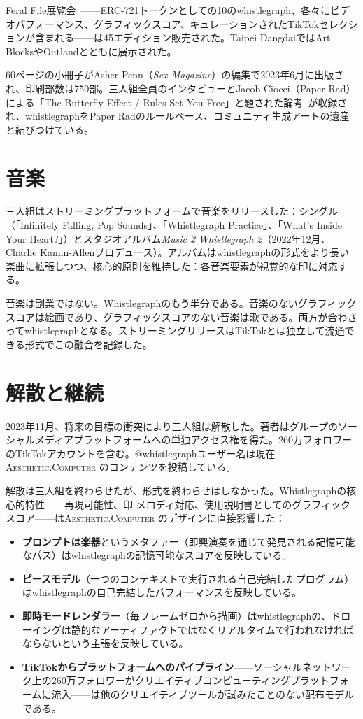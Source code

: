 \documentclass[10pt,letterpaper,twocolumn]{article}
\newcommand{\ac}{\textsc{Aesthetic.Computer}}
\begin{document}
Feral File展覧会~\citep{feralfile2022ten}——ERC-721トークンとしての10のwhistlegraph、各々にビデオパフォーマンス、グラフィックスコア、キュレーションされたTikTokセレクションが含まれる——は45エディション販売された。Taipei DangdaiではArt BlocksやOutlandとともに展示された。

60ページの小冊子がAsher Penn（\emph{Sex Magazine}）の編集で2023年6月に出版され、印刷部数は750部。三人組全員のインタビューとJacob Ciocci（Paper Rad）による「The Butterfly Effect / Rules Set You Free」と題された論考~\citep{ciocci2023butterfly}が収録され、whistlegraphをPaper Radのルールベース、コミュニティ生成アートの遺産と結びつけている。

\section{音楽}

三人組はストリーミングプラットフォームで音楽をリリースした：シングル（「Infinitely Falling, Pop Sounds」、「Whistlegraph Practice」、「What's Inside Your Heart?」）とスタジオアルバム\emph{Music 2 Whistlegraph 2}（2022年12月、Charlie Kamin-Allenプロデュース）。アルバムはwhistlegraphの形式をより長い楽曲に拡張しつつ、核心的原則を維持した：各音楽要素が視覚的な印に対応する。

音楽は副業ではない。Whistlegraphのもう半分である。音楽のないグラフィックスコアは絵画であり、グラフィックスコアのない音楽は歌である。両方が合わさってwhistlegraphとなる。ストリーミングリリースはTikTokとは独立して流通できる形式でこの融合を記録した。

\section{解散と継続}

2023年11月、将来の目標の衝突により三人組は解散した。著者はグループのソーシャルメディアプラットフォームへの単独アクセス権を得た。260万フォロワーのTikTokアカウントを含む。@whistlegraphユーザー名は現在\ac{} のコンテンツを投稿している。

解散は三人組を終わらせたが、形式を終わらせはしなかった。Whistlegraphの核心的特性——再現可能性、印-メロディ対応、使用説明書としてのグラフィックスコア——は\ac{} のデザインに直接影響した：

\begin{itemize}
  \item \textbf{プロンプトは楽器}というメタファー（即興演奏を通じて発見される記憶可能なパス）はwhistlegraphの記憶可能なスコアを反映している。
  \item \textbf{ピースモデル}（一つのコンテキストで実行される自己完結したプログラム）はwhistlegraphの自己完結したパフォーマンスを反映している。
  \item \textbf{即時モードレンダラー}（毎フレームゼロから描画）はwhistlegraphの、ドローイングは静的なアーティファクトではなくリアルタイムで行われなければならないという主張を反映している。
  \item \textbf{TikTokからプラットフォームへのパイプライン}——ソーシャルネットワーク上の260万フォロワーがクリエイティブコンピューティングプラットフォームに流入——は他のクリエイティブツールが試みたことのない配布モデルである。
\end{itemize}
\end{document}
